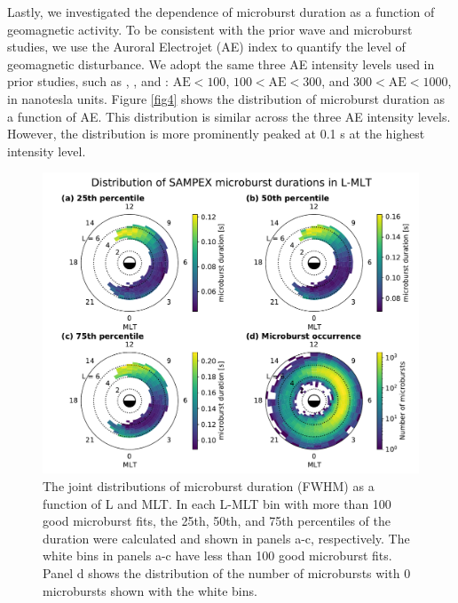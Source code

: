 \documentclass[draft]{agujournal2019}
\begin{document}
Lastly, we investigated the dependence of microburst duration as a function of geomagnetic activity. To be consistent with the prior wave and microburst studies, we use the Auroral Electrojet (AE) index to quantify the level of geomagnetic disturbance. We adopt the same three AE intensity levels used in prior studies, such as , , and : $\mathrm{AE} < 100$, $100 < \mathrm{AE} < 300$, and $300 < \mathrm{AE} < 1000$, in nanotesla units. Figure \ref{fig4} shows the distribution of microburst duration as a function of AE. This distribution is similar across the three AE intensity levels. However, the distribution is more prominently peaked at 0.1 s at the highest intensity level.

\begin{figure}
\noindent\includegraphics[width=\textwidth]{figures/fig2.pdf}
\caption{The joint distributions of microburst duration (FWHM) as a function of L and MLT. In each L-MLT bin with more than 100 good microburst fits, the 25th, 50th, and 75th percentiles of the duration were calculated and shown in panels a-c, respectively. The white bins in panels a-c have less than 100 good microburst fits. Panel d shows the distribution of the number of microbursts with 0 microbursts shown with the white bins.}
\label{fig2}
\end{figure}
\end{document}
